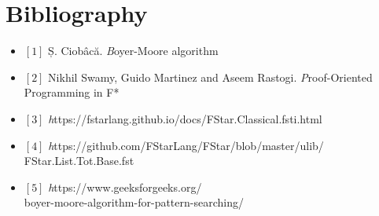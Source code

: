 \chapter*{Bibliography} 

\begin{itemize}
    \item $[1]$ Ș. Ciobâcă. \textit Boyer-Moore algorithm
    \item $[2]$ Nikhil Swamy, Guido Martinez and Aseem Rastogi. \textit Proof-Oriented Programming in F*
    \item $[3]$ \textit https://fstarlang.github.io/docs/FStar.Classical.fsti.html
    \item $[4]$ \textit https://github.com/FStarLang/FStar/blob/master/ulib/ \\
    \indent FStar.List.Tot.Base.fst
    \item $[5]$ \textit https://www.geeksforgeeks.org/ \\
    \indent boyer-moore-algorithm-for-pattern-searching/
\end{itemize}